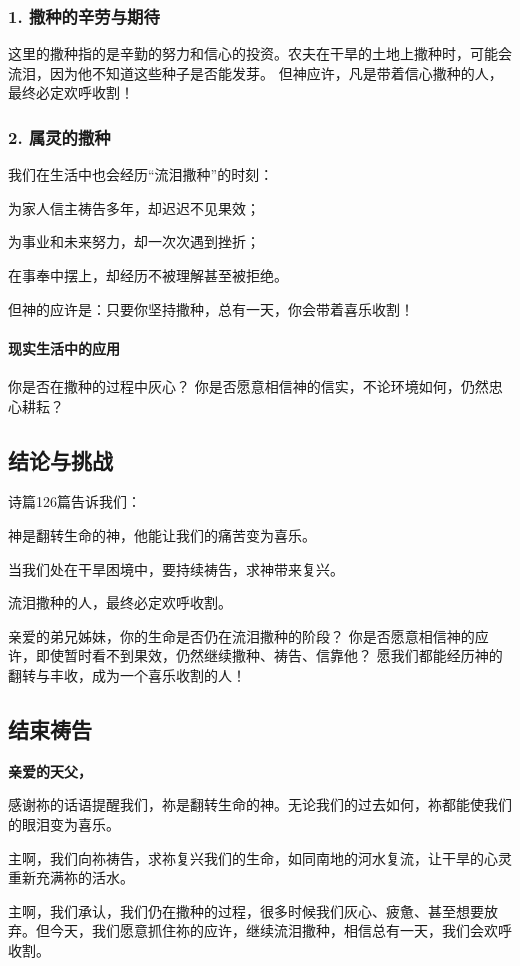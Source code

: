 \documentclass[a4paper, 12pt]{article}
\begin{document}
\subsubsection*{1. 撒种的辛劳与期待}
这里的撒种指的是辛勤的努力和信心的投资。农夫在干旱的土地上撒种时，可能会流泪，因为他不知道这些种子是否能发芽。
但神应许，凡是带着信心撒种的人，最终必定欢呼收割！
\subsubsection*{2. 属灵的撒种}
我们在生活中也会经历“流泪撒种”的时刻：

为家人信主祷告多年，却迟迟不见果效；

为事业和未来努力，却一次次遇到挫折；

在事奉中摆上，却经历不被理解甚至被拒绝。

但神的应许是：只要你坚持撒种，总有一天，你会带着喜乐收割！

\paragraph*{现实生活中的应用}

你是否在撒种的过程中灰心？
你是否愿意相信神的信实，不论环境如何，仍然忠心耕耘？
\subsection*{结论与挑战}
诗篇126篇告诉我们：

神是翻转生命的神，他能让我们的痛苦变为喜乐。

当我们处在干旱困境中，要持续祷告，求神带来复兴。

流泪撒种的人，最终必定欢呼收割。

亲爱的弟兄姊妹，你的生命是否仍在流泪撒种的阶段？ 你是否愿意相信神的应许，即使暂时看不到果效，仍然继续撒种、祷告、信靠他？ 愿我们都能经历神的翻转与丰收，成为一个喜乐收割的人！

\subsection*{结束祷告}
\textbf{亲爱的天父，}

感谢祢的话语提醒我们，祢是翻转生命的神。无论我们的过去如何，祢都能使我们的眼泪变为喜乐。

主啊，我们向祢祷告，求祢复兴我们的生命，如同南地的河水复流，让干旱的心灵重新充满祢的活水。

主啊，我们承认，我们仍在撒种的过程，很多时候我们灰心、疲惫、甚至想要放弃。但今天，我们愿意抓住祢的应许，继续流泪撒种，相信总有一天，我们会欢呼收割。
\end{document}

